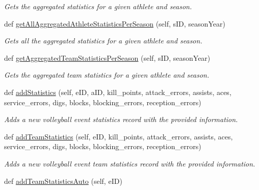 \begin{DoxyCompactItemize}
\begin{DoxyCompactList}\small\item\em Gets the aggregated statistics for a given athlete and season. \end{DoxyCompactList}\item 
def \hyperlink{classhandler_1_1dao_1_1volleyball__event__dao_1_1_volleyball_event_d_a_o_a163a639d8d5ec7cc4863c7512fea63c5}{get\+All\+Aggregated\+Athlete\+Statistics\+Per\+Season} (self, s\+ID, season\+Year)
\begin{DoxyCompactList}\small\item\em Gets all the aggregated statistics for a given athlete and season. \end{DoxyCompactList}\item 
def \hyperlink{classhandler_1_1dao_1_1volleyball__event__dao_1_1_volleyball_event_d_a_o_a02252b04134d696cadf040d9c0462e8c}{get\+Aggregated\+Team\+Statistics\+Per\+Season} (self, s\+ID, season\+Year)
\begin{DoxyCompactList}\small\item\em Gets the aggregated team statistics for a given athlete and season. \end{DoxyCompactList}\item 
def \hyperlink{classhandler_1_1dao_1_1volleyball__event__dao_1_1_volleyball_event_d_a_o_acd35c968949cd0a32d124914433ec0d7}{add\+Statistics} (self, e\+ID, a\+ID, kill\+\_\+points, attack\+\_\+errors, assists, aces, service\+\_\+errors, digs, blocks, blocking\+\_\+errors, reception\+\_\+errors)
\begin{DoxyCompactList}\small\item\em Adds a new volleyball event statistics record with the provided information. \end{DoxyCompactList}\item 
def \hyperlink{classhandler_1_1dao_1_1volleyball__event__dao_1_1_volleyball_event_d_a_o_a4648b391f6897b4e6d5a5802b5627511}{add\+Team\+Statistics} (self, e\+ID, kill\+\_\+points, attack\+\_\+errors, assists, aces, service\+\_\+errors, digs, blocks, blocking\+\_\+errors, reception\+\_\+errors)
\begin{DoxyCompactList}\small\item\em Adds a new volleyball event team statistics record with the provided information. \end{DoxyCompactList}\item 
def \hyperlink{classhandler_1_1dao_1_1volleyball__event__dao_1_1_volleyball_event_d_a_o_a626826bd1c94f9568e9a493690af2659}{add\+Team\+Statistics\+Auto} (self, e\+ID)

\end{DoxyCompactItemize}
